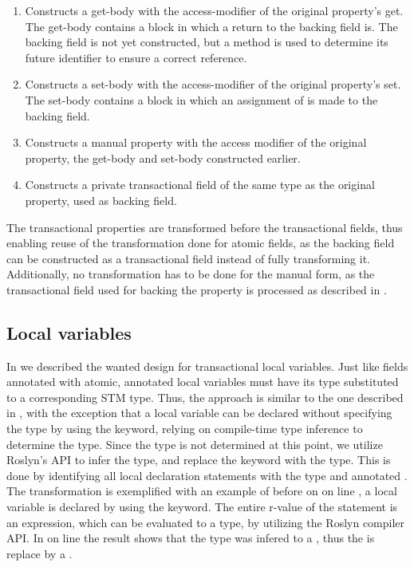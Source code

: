 \begin{enumerate}
	\item Constructs a get-body with the access-modifier of the original property's get. The get-body contains a block in which a return to the backing field is. The backing field is not yet constructed, but a method is used to determine its future identifier to ensure a correct reference.
	\item Constructs a set-body with the access-modifier of the original property's set. The set-body contains a block in which an assignment of  is made to the backing field.
	\item Constructs a manual property with the access modifier of the original property, the get-body and set-body constructed earlier.
	\item Constructs a private transactional field of the same type as the original property, used as backing field.
\end{enumerate}

The transactional properties are transformed before the transactional fields, thus enabling reuse of the transformation done for atomic fields, as the backing field can be constructed as a transactional field instead of fully transforming it. Additionally, no transformation has to be done for the manual form, as the transactional field used for backing the property is processed as described in . 


\subsection{Local variables}
In  we described the wanted design for transactional local variables. 
Just like fields annotated with atomic, annotated local variables must have its type substituted to a corresponding \ac{STM} type. Thus, the approach is similar to the one described in , with the exception that a local variable can be declared without specifying the type by using the  keyword, relying on compile-time type inference to determine the type. Since the type is not determined at this point, we utilize Roslyn's \ac{API} to infer the type, and replace the  keyword with the type. This is done by identifying all local declaration statements with the type  and annotated . The transformation is exemplified with an example of before on  on line , a local variable is declared by using the  keyword. The entire r-value of the statement is an expression, which can be evaluated to a type, by utilizing the Roslyn compiler \ac{API}. In  on line   the result shows that the type was infered to a , thus the  is replace by a .

